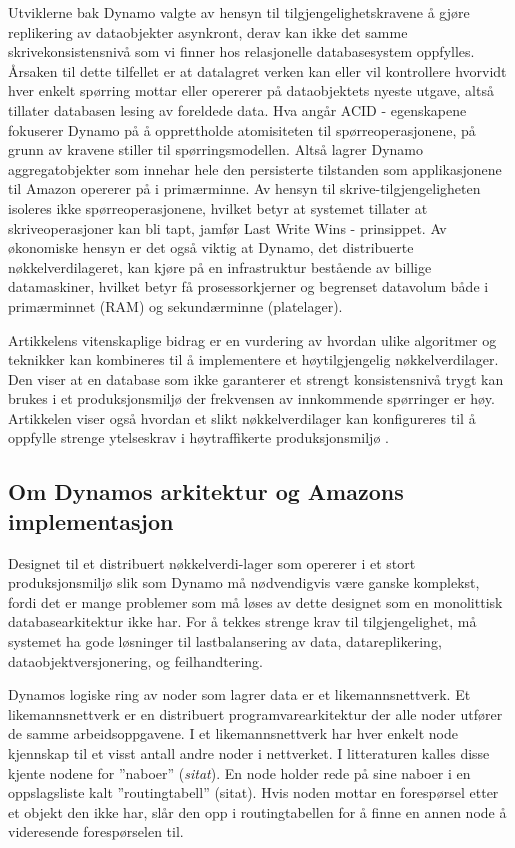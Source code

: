 Utviklerne bak Dynamo valgte av hensyn til tilgjengelighetskravene å gjøre replikering av dataobjekter asynkront, derav kan ikke det samme skrivekonsistensnivå som vi finner hos relasjonelle databasesystem oppfylles. Årsaken til dette tilfellet er at datalagret verken kan eller vil kontrollere hvorvidt hver enkelt spørring mottar eller opererer på dataobjektets nyeste utgave, altså tillater databasen lesing av foreldede data. Hva angår ACID - egenskapene fokuserer Dynamo på å opprettholde atomisiteten til spørreoperasjonene, på grunn av kravene \cite{decandia2007} stiller til spørringsmodellen. Altså lagrer Dynamo aggregatobjekter som innehar hele den persisterte tilstanden som applikasjonene til Amazon opererer på i primærminne. Av hensyn til skrive-tilgjengeligheten isoleres ikke spørreoperasjonene, hvilket betyr at systemet tillater at skriveoperasjoner kan bli tapt, jamfør Last Write Wins - prinsippet. Av økonomiske hensyn er det også viktig at Dynamo, det distribuerte nøkkelverdilageret, kan kjøre på en infrastruktur bestående av billige datamaskiner, hvilket betyr få prosessorkjerner og begrenset datavolum både i primærminnet (RAM) og sekundærminne (platelager).

Artikkelens vitenskaplige bidrag er en vurdering av hvordan ulike algoritmer og teknikker kan kombineres til å implementere et høytilgjengelig nøkkelverdilager. Den viser at en database som ikke garanterer et strengt konsistensnivå trygt kan brukes i et produksjonsmiljø der frekvensen av innkommende spørringer er høy. Artikkelen viser også hvordan et slikt nøkkelverdilager kan konfigureres til å oppfylle strenge ytelseskrav i høytraffikerte produksjonsmiljø \citep{decandia2007}.

\subsection{Om Dynamos arkitektur og Amazons implementasjon} \label{dynark}

Designet til et distribuert nøkkelverdi-lager som opererer i et stort produksjonsmiljø slik som Dynamo må nødvendigvis være ganske komplekst, fordi det er mange problemer som må løses av dette designet som en monolittisk databasearkitektur ikke har. For å tekkes strenge krav til tilgjengelighet, må systemet ha gode løsninger til lastbalansering av data, datareplikering, dataobjektversjonering, og feilhandtering.

Dynamos logiske ring av noder som lagrer data er et likemannsnettverk. Et likemannsnettverk er en distribuert programvarearkitektur der alle noder utfører de samme arbeidsoppgavene. I et likemannsnettverk har hver enkelt node kjennskap til et visst antall andre noder i nettverket. I litteraturen kalles disse kjente nodene for ''naboer'' (\textsl{sitat}). En node holder rede på sine naboer i en oppslagsliste kalt ''routingtabell'' (sitat). Hvis noden mottar en forespørsel etter et objekt den ikke har, slår den opp i routingtabellen for å finne en annen node å videresende forespørselen til.

